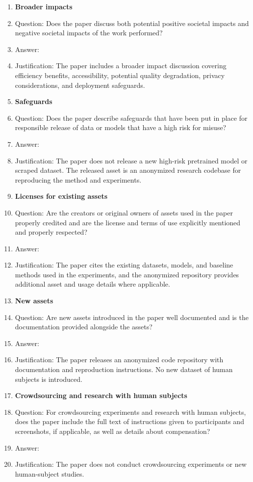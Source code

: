 \begin{enumerate}
\item {\bf Broader impacts}
    \item[] Question: Does the paper discuss both potential positive societal impacts and negative societal impacts of the work performed?
    \item[] Answer: \answerYes{}
    \item[] Justification: The paper includes a broader impact discussion covering efficiency benefits, accessibility, potential quality degradation, privacy considerations, and deployment safeguards.

\item {\bf Safeguards}
    \item[] Question: Does the paper describe safeguards that have been put in place for responsible release of data or models that have a high risk for misuse?
    \item[] Answer: \answerNA{}
    \item[] Justification: The paper does not release a new high-risk pretrained model or scraped dataset. The released asset is an anonymized research codebase for reproducing the method and experiments.

\item {\bf Licenses for existing assets}
    \item[] Question: Are the creators or original owners of assets used in the paper properly credited and are the license and terms of use explicitly mentioned and properly respected?
    \item[] Answer: \answerYes{}
    \item[] Justification: The paper cites the existing datasets, models, and baseline methods used in the experiments, and the anonymized repository provides additional asset and usage details where applicable.

\item {\bf New assets}
    \item[] Question: Are new assets introduced in the paper well documented and is the documentation provided alongside the assets?
    \item[] Answer: \answerYes{}
    \item[] Justification: The paper releases an anonymized code repository with documentation and reproduction instructions. No new dataset of human subjects is introduced.

\item {\bf Crowdsourcing and research with human subjects}
    \item[] Question: For crowdsourcing experiments and research with human subjects, does the paper include the full text of instructions given to participants and screenshots, if applicable, as well as details about compensation?
    \item[] Answer: \answerNA{}
    \item[] Justification: The paper does not conduct crowdsourcing experiments or new human-subject studies.


\end{enumerate}
